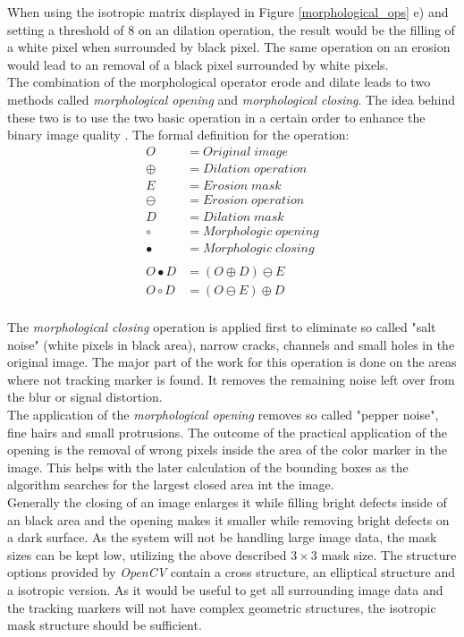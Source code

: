 When using the isotropic matrix displayed in Figure \ref{morphological_ops} e) and setting a threshold of 8 on an dilation operation, the result would be the filling of a white pixel when surrounded by black pixel. The same operation on an erosion would lead to an removal of a black pixel surrounded by white pixels.\\
The combination of the morphological operator erode and dilate leads to two methods called \textit{morphological opening} and \textit{morphological closing}. The idea behind these two is to use the two basic operation in a certain order to enhance the binary image quality \cite[chapter~3.12]{Davies.2017}.
The formal definition for the operation:
\begin{equation}
 \begin{split}
O&=Original\; image \\
\oplus&= Dilation\; operation\\
E&=Erosion\; mask\\
\ominus&= Erosion\; operation\\
D&=Dilation\; mask\\
\circ&= Morphologic\; opening\\
\bullet&= Morphologic\; closing\\
\\
O\bullet D&=(O\oplus D)\ominus E\\
O\circ D&=(O \ominus E)\oplus D\\
\end{split}
\end{equation}

The \textit{morphological closing} operation is applied first to eliminate so called "salt noise" (white pixels in black area), narrow cracks, channels and small holes in the original image. The major part of the work for this operation is done on the areas where not tracking marker is found. It removes the remaining noise left over from the blur or signal distortion.\\
The application of the \textit{morphological opening} removes so called "pepper noise", fine hairs and small protrusions. The outcome of the practical application of the opening is the removal of wrong pixels inside the area of the color marker in the image. This helps with the later calculation of the bounding boxes as the algorithm searches for the largest closed area int the image.\\
Generally the closing of an image enlarges it while filling bright defects inside of an black area and the opening makes it smaller while removing bright defects on a dark surface.
As the system will not be handling large image data, the mask sizes can be kept low, utilizing the above described $3\times 3$ mask size. The structure options provided by \textit{OpenCV} contain a cross structure, an elliptical structure and a isotropic version. As it would be useful to get all surrounding image data and the tracking markers will not have complex geometric structures, the isotropic mask structure should be sufficient.
